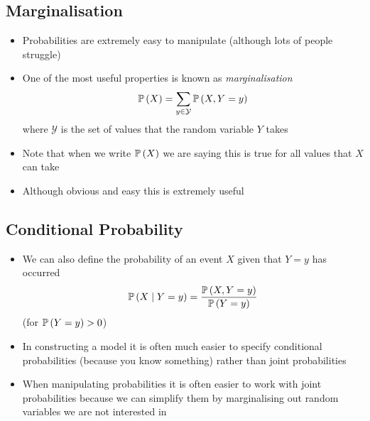 
\begin{slide}
\section{Marginalisation}

\begin{PauseHighLight}
  \begin{itemize}
  \item Probabilities are extremely easy to manipulate (although lots
    of people struggle)\pause
  \item One of the most useful properties is known as \emph{marginalisation}
    \begin{align*}
      \mathbb{P}\left( X \right) = \sum_{y\in\mathcal{Y}} \mathbb{P}\left( X, Y=y \right)
    \end{align*}
    where $\mathcal{Y}$ is the set of values that the random variable
    $Y$ takes\pause
  \item Note that when we write $\mathbb{P}\left( X \right)$ we are saying this is true
    for all values that $X$ can take\pause
  \item Although obvious and easy this is extremely useful\pause
  \end{itemize}
\end{PauseHighLight}
\end{slide}


\begin{slide}
\section{Conditional Probability}

\begin{PauseHighLight}
  \begin{itemize}
  \item We can also define the probability of an event $X$ given that
    $Y=y$ has occurred
    \begin{align*}
      \mathbb{P}\left( X\mid Y=y \right) = \frac{\mathbb{P}\left( X,Y=y \right)}{\mathbb{P}\left( Y=y \right)}
    \end{align*}
    (for $\mathbb{P}\left( Y=y \right)>0$)\pause
  \item In constructing a model it is often much easier to specify
    conditional probabilities (because you know something) rather than
    joint probabilities\pause
  \item When manipulating probabilities it is often easier to work
    with joint probabilities because we can simplify them by
    marginalising out random variables we are not interested in\pause
  \end{itemize} 
\end{PauseHighLight}

\end{slide}



